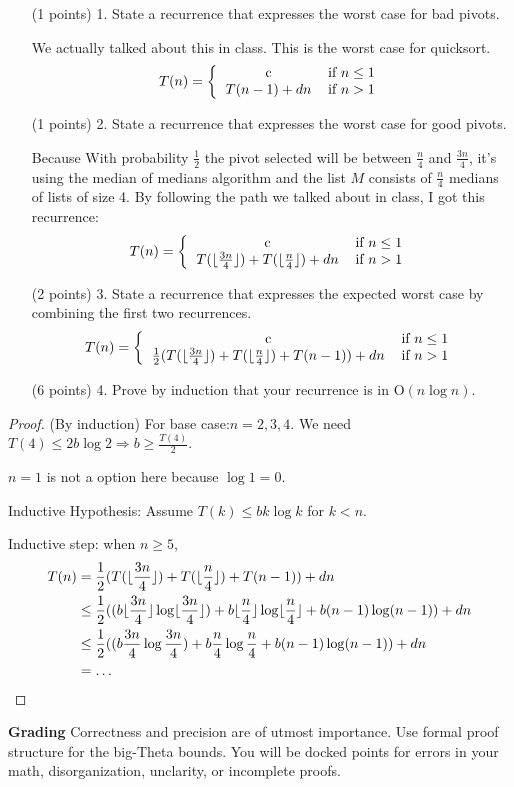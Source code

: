 \documentclass[paper=a4, fontsize=11pt]{scrartcl}
\DeclarePairedDelimiter\floor{\lfloor}{\rfloor}
\numberwithin{equation}{section}		%
\numberwithin{figure}{section}			%
\numberwithin{table}{section}				%
\begin{document}
\begin{enumerate}
\item [(1 points) 1.] State a recurrence that expresses the worst case for bad pivots.

We actually talked about this in class. This is the worst case for quicksort.
\[
T(n) = \left\{
\begin{tabular}{cc}
c & \text{if} $n\leq1$ \\
$T(n-1)+dn$ & \text{if} $n>1$ \\
\end{tabular}\right.
\]
\item [(1 points) 2.] State a recurrence that expresses the worst case for good pivots.

Because With probability $\frac{1}{2}$ the pivot selected will be between $\frac{n}{4}$ and $\frac{3n}{4}$, it's using the median of medians algorithm and the list $M$ consists of $\frac{n}{4}$ medians of lists of size 4. By following the path we talked about in class, I got this recurrence:
\[
T(n) = \left\{
\begin{tabular}{cc}
c & \text{if} $n\leq1$ \\
$T(\floor{\frac{3n}{4}}) + T(\floor{\frac{n}{4}})+dn$ & \text{if} $n>1$ \\
\end{tabular}\right.
\]
\item [(2 points) 3.] State a recurrence that expresses the expected worst case by combining the first two recurrences.
\[
T(n) = \left\{
\begin{tabular}{cc}
c & \text{if} $n\leq1$ \\
$\frac{1}{2}(T(\floor{\frac{3n}{4}}) + T(\floor{\frac{n}{4}}) + T(n-1))+dn$ & \text{if} $n>1$ \\
\end{tabular}\right.
\]



\item [(6 points) 4.] Prove by induction that your recurrence is in $\text{O}(n\log n)$.
\end{enumerate}

\begin{proof}(By induction)
	For base case:$n=2,3,4$. We need $T(4) \leq 2b\log 2 \Rightarrow b\geq \frac{T(4)}{2}$.
	
	$n=1$ is not a option here because $\log 1 = 0$.
	
	Inductive Hypothesis: Assume $T(k) \leq bk\log k$ for $k<n$.
	
	Inductive step: when $n \geq 5$,
	\begin{align*}
		T(n) &= \frac{1}{2}(T(\floor{\frac{3n}{4}}) + T(\floor{\frac{n}{4}}) + T(n-1))+dn \\
		&\leq \frac{1}{2}((b\floor{\frac{3n}{4}}\log \floor{\frac{3n}{4}}) + b\floor{\frac{n}{4}}\log \floor{\frac{n}{4}} + b(n-1) \log (n-1)) + dn \\
		&\leq \frac{1}{2}((b\frac{3n}{4}\log \frac{3n}{4}) + b\frac{n}{4}\log \frac{n}{4} + b(n-1) \log (n-1)) + dn \\
		&= \dots
	\end{align*}
\end{proof}





\noindent\textbf{Grading} Correctness and precision are of utmost importance.  Use formal proof structure for the big-Theta bounds.  You will be docked points for errors in your math, disorganization, unclarity, or incomplete proofs.    
\end{document}
